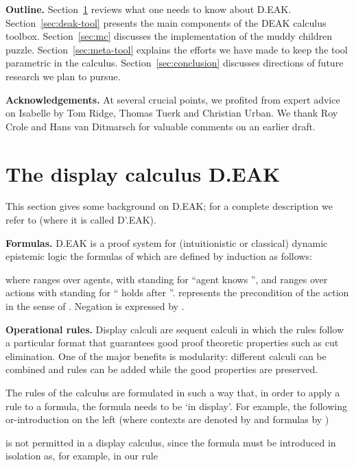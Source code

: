 \documentclass[runningheads,a4paper]{llncs}
\begin{document}
\medskip\noindent\textbf{Outline. } Section~\ref{sec:deak}  reviews what one needs to know about D.EAK. Section~\ref{sec:deak-tool} presents the main components of the DEAK calculus toolbox. Section~\ref{sec:mc} discusses the implementation of the muddy children puzzle. Section~\ref{sec:meta-tool} explains the efforts we have made to keep the tool parametric in the calculus. Section~\ref{sec:conclusion} discusses directions of future research we plan to pursue.

\medskip\noindent\textbf{Acknowledgements. }  At several crucial points, we profited from expert advice on Isabelle by Tom Ridge, Thomas Tuerk and Christian Urban. We thank Roy Crole and Hans van Ditmarsch for valuable comments on an earlier draft.


\section{The display calculus D.EAK}\label{sec:deak}
This section gives some background on D.EAK; for a complete description we refer to \cite{DEAK} (where it is called D'.EAK). 

\newcommand{\Fma}{\phi}
\medskip\noindent\textbf{Formulas.} D.EAK is a proof system for (intuitionistic or classical) dynamic epistemic logic the formulas of which are defined by induction as follows:

where  ranges over agents, with  standing for ``agent  knows '', and  ranges over actions with  standing for `` holds after ''.  represents the precondition of the action  in the sense of \cite{bms}. Negation is expressed by .

\medskip\noindent\textbf{Operational rules. } Display calculi are sequent calculi in which the rules follow a particular format that guarantees good proof theoretic properties such as cut elimination. One of the major benefits is modularity: different calculi can be combined and rules can be added while the good properties are preserved.

The rules of the calculus are formulated in such a way that, in order to apply a rule to a formula, the formula needs to be `in display'. For example, the following or-introduction on the left (where contexts are denoted by  and formulas by )

is not permitted in a display calculus, since the formula  must be introduced in isolation as, for example, in our rule
\end{document}
